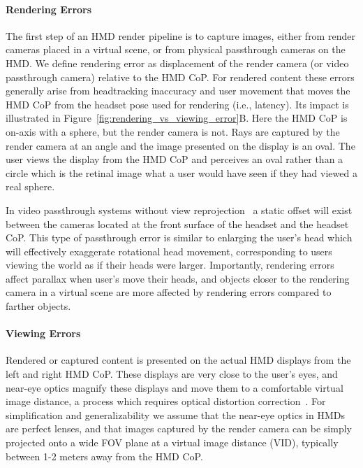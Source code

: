 \documentclass[acmlarge, nonacm]{acmart}
\begin{document}
\paragraph{Rendering Errors}
The first step of an HMD render pipeline is to capture images, either from render cameras placed in a virtual scene, or from physical passthrough cameras on the HMD. We define rendering error as displacement of the render camera (or video passthrough camera) relative to the HMD CoP. For rendered content these errors generally arise from headtracking inaccuracy and user movement that moves the HMD CoP from the headset pose used for rendering (i.e., latency). Its impact is illustrated in Figure~\ref{fig:rendering_vs_viewing_error}B. Here the HMD CoP is on-axis with a sphere, but the render camera is not. Rays are captured by the render camera at an angle and the image presented on the display is an oval. The user views the display from the HMD CoP and perceives an oval rather than a circle which is the retinal image what a user would have seen if they had viewed a real sphere.

In video passthrough systems without view reprojection~\cite{ElChemalyGAP,kuo23} a static offset will exist between the cameras located at the front surface of the headset and the headset CoP. This type of passthrough error is similar to enlarging the user's head which will effectively exaggerate rotational head movement, corresponding to users viewing the world as if their heads were larger. Importantly, rendering errors affect parallax when user's move their heads, and objects closer to the rendering camera in a virtual scene are more affected by rendering errors compared to farther objects.

\paragraph{Viewing Errors}
Rendered or captured content is presented on the actual HMD displays from the left and right HMD CoP. These displays are very close to the user's eyes, and near-eye optics magnify these displays and move them to a comfortable virtual image distance, a process which requires optical distortion correction~\cite{robinett92, rolland93}. For simplification and generalizability we assume that the near-eye optics in HMDs are perfect lenses, and that images captured by the render camera can be simply projected onto a wide FOV plane at a virtual image distance (VID), typically between 1-2 meters away from the HMD CoP.
\end{document}
